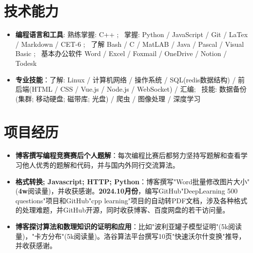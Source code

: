 \documentclass{resume}
\begin{document}
\section{技术能力}
\begin{itemize}[parsep=0.2ex]
	\item \textbf{编程语言和工具}: 熟练掌握: C++ ; \, 掌握: Python / JavaScript / Git / LaTex / Markdown / CET-6 ; \, 了解 Bash / C / MatLAB / Java / Pascal / Visual Basic ; \, 基本办公软件 Word / Excel / Foxmail / OneDrive / Notion / Todesk
	\item \textbf{专业技能}：了解: Linux / 计算机网络 / 操作系统 / SQL(redis数据结构) / 前后端(HTML / CSS / Vue.js / Node.js / WebSocket) / 汇编; \, 技能: 数据备份(集群; 移动硬盘; 磁带库; 光盘) / 爬虫 / 图像处理 / 深度学习
\end{itemize}


\section{项目经历}
  
\begin{itemize}
  \item \textbf{博客撰写编程竞赛赛后个人题解}：每次编程比赛后都努力坚持写题解和查看学习他人优秀的题解和代码，并与国内外同行交流算法。
  \item \textbf{格式转换; Javascript; HTTP; Python}：博客撰写"Word批量修改图片大小"(\textbf{4w}阅读量)，并收获感谢。\textbf{2024.10月份}，编写GitHub"DeepLearning 500 questions"项目和GitHub"cpp learning"项目的自动转PDF文档，涉及各种格式的处理难题，并GitHub开源，同时收获博客、百度网盘的若干访问量。
  \item \textbf{博客探讨算法和数理知识的证明和应用}：比如"波利亚罐子模型证明"(5k阅读量)，"卡方分布"(5k阅读量)。洛谷算法平台撰写10页"快速沃尔什变换"推导，并收获感谢。

\end{itemize}
\end{document}
